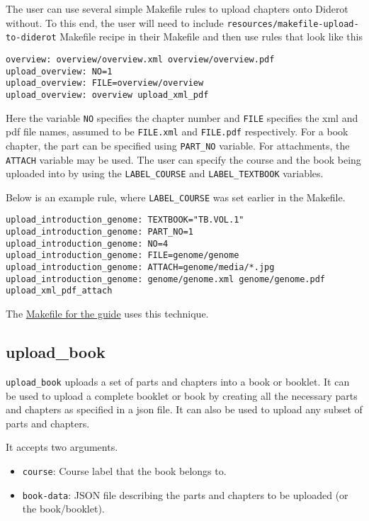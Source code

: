 \begin{gram}
The user can use several simple Makefile rules to upload chapters onto
Diderot without.  To this end, the user will need to include
\verb|resources/makefile-upload-to-diderot| Makefile recipe in their
Makefile and then use rules that look like this
\begin{verbatim}
overview: overview/overview.xml overview/overview.pdf
upload_overview: NO=1
upload_overview: FILE=overview/overview
upload_overview: overview upload_xml_pdf
\end{verbatim}

Here the variable \verb|NO| specifies the chapter number and \verb|FILE| specifies the xml and pdf file names, assumed to be \verb|FILE.xml| and \verb|FILE.pdf| respectively.  
%
For a book chapter, the part can be specified using \verb|PART_NO| variable.
%
For attachments, the \verb|ATTACH| variable may be used.
%
The user can specify the course and the book being uploaded into by using the
\verb|LABEL_COURSE| and \verb|LABEL_TEXTBOOK| variables. 

Below is an example rule, where \verb|LABEL_COURSE| was set earlier in the Makefile.


\begin{verbatim}
upload_introduction_genome: TEXTBOOK="TB.VOL.1"
upload_introduction_genome: PART_NO=1 
upload_introduction_genome: NO=4
upload_introduction_genome: FILE=genome/genome
upload_introduction_genome: ATTACH=genome/media/*.jpg 
upload_introduction_genome: genome/genome.xml genome/genome.pdf upload_xml_pdf_attach
\end{verbatim}
\end{gram}

\begin{gram}
The \href{file://cli/attachments/Makefile-guide}{Makefile for the guide} uses this technique.

\end{gram}

\subsection{upload\_book}

\begin{gram}
\verb|upload_book| uploads a set of parts and chapters into a book or booklet.
%
It can be used to upload a complete booklet or book by creating all
the necessary parts and chapters as specified in a json file.
%
It can also be used to upload any subset of parts and chapters.

It accepts two arguments.
%
\begin{itemize}
  \item \verb|course|: Course label that the book belongs to.
  \item \verb|book-data|: JSON file describing the parts and chapters to be uploaded (or the book/booklet).
\end{itemize}
\end{gram}

